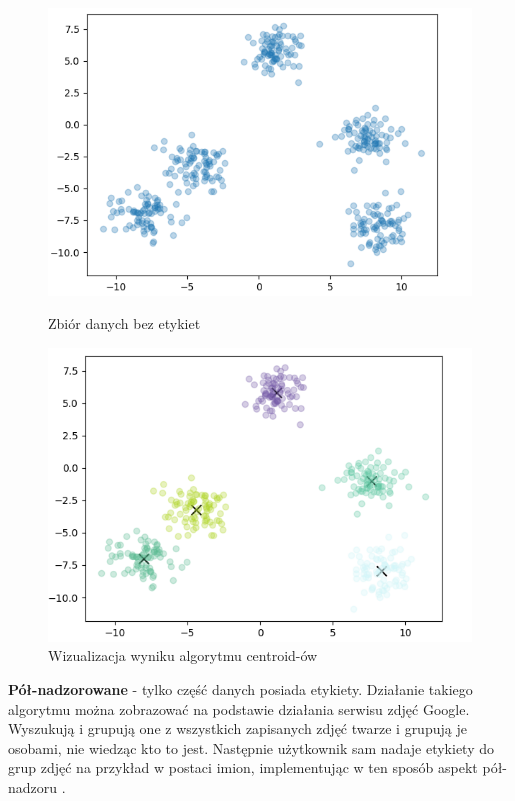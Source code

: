 \begin{description}
    \begin{figure}[h!]
    
    \begin{center}
        \includegraphics[scale=0.76]{img/unsupervised.png}
        \caption{Zbiór danych bez etykiet}
        \label{fig:nienadzorowane}    
    \end{center}
    
    \begin{center}
        \includegraphics[scale=0.76]{img/kmeans.png}
        \caption{Wizualizacja wyniku algorytmu centroid-ów}
        \label{fig:kmeans}
    \end{center}
    
\end{figure}

\pagebreak
    
\item \textbf{Pół-nadzorowane} - tylko część danych posiada etykiety. Działanie takiego algorytmu można zobrazować na podstawie działania serwisu zdjęć Google. Wyszukują i grupują one z wszystkich zapisanych zdjęć twarze i grupują je osobami, nie wiedząc kto to jest. Następnie użytkownik sam nadaje etykiety do grup zdjęć na przykład w postaci imion, implementując w ten sposób aspekt pół-nadzoru \cite{oreilly}.  


\end{description}
